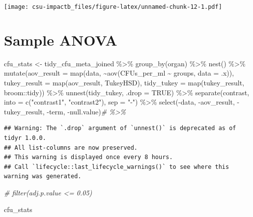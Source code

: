 \documentclass[
]{book}
\newenvironment{Shaded}{\begin{snugshade}}{\end{snugshade}}
\newcommand{\AttributeTok}[1]{\textcolor[rgb]{0.77,0.63,0.00}{#1}}
\newcommand{\CommentTok}[1]{\textcolor[rgb]{0.56,0.35,0.01}{\textit{#1}}}
\newcommand{\ConstantTok}[1]{\textcolor[rgb]{0.00,0.00,0.00}{#1}}
\newcommand{\FunctionTok}[1]{\textcolor[rgb]{0.00,0.00,0.00}{#1}}
\newcommand{\NormalTok}[1]{#1}
\newcommand{\OtherTok}[1]{\textcolor[rgb]{0.56,0.35,0.01}{#1}}
\newcommand{\SpecialCharTok}[1]{\textcolor[rgb]{0.00,0.00,0.00}{#1}}
\newcommand{\StringTok}[1]{\textcolor[rgb]{0.31,0.60,0.02}{#1}}
\begin{document}
\texttt{[image: csu-impactb\_files/figure-latex/unnamed-chunk-12-1.pdf]}

\hypertarget{sample-anova}{%
\section{Sample ANOVA}\label{sample-anova}}

\begin{Shaded}
\begin{Highlighting}[]
\NormalTok{cfu\_stats }\OtherTok{\textless{}{-}}\NormalTok{ tidy\_cfu\_meta\_joined }\SpecialCharTok{\%\textgreater{}\%} 
  \FunctionTok{group\_by}\NormalTok{(organ) }\SpecialCharTok{\%\textgreater{}\%}
  \FunctionTok{nest}\NormalTok{() }\SpecialCharTok{\%\textgreater{}\%}
  \FunctionTok{mutate}\NormalTok{(}\AttributeTok{aov\_result =} \FunctionTok{map}\NormalTok{(data, }\SpecialCharTok{\textasciitilde{}}\FunctionTok{aov}\NormalTok{(CFUs\_per\_ml }\SpecialCharTok{\textasciitilde{}}\NormalTok{ groups, }\AttributeTok{data =}\NormalTok{ .x)),}
         \AttributeTok{tukey\_result =} \FunctionTok{map}\NormalTok{(aov\_result, TukeyHSD),}
         \AttributeTok{tidy\_tukey =} \FunctionTok{map}\NormalTok{(tukey\_result, broom}\SpecialCharTok{::}\NormalTok{tidy)) }\SpecialCharTok{\%\textgreater{}\%}
  \FunctionTok{unnest}\NormalTok{(tidy\_tukey, }\AttributeTok{.drop =} \ConstantTok{TRUE}\NormalTok{) }\SpecialCharTok{\%\textgreater{}\%}
  \FunctionTok{separate}\NormalTok{(contrast, }\AttributeTok{into =} \FunctionTok{c}\NormalTok{(}\StringTok{"contrast1"}\NormalTok{, }\StringTok{"contrast2"}\NormalTok{), }\AttributeTok{sep =} \StringTok{"{-}"}\NormalTok{) }\SpecialCharTok{\%\textgreater{}\%}
  \FunctionTok{select}\NormalTok{(}\SpecialCharTok{{-}}\NormalTok{data, }\SpecialCharTok{{-}}\NormalTok{aov\_result, }\SpecialCharTok{{-}}\NormalTok{tukey\_result, }\SpecialCharTok{{-}}\NormalTok{term, }\SpecialCharTok{{-}}\NormalTok{null.value)}\CommentTok{\# \%\textgreater{}\%}
\end{Highlighting}
\end{Shaded}

\begin{verbatim}
## Warning: The `.drop` argument of `unnest()` is deprecated as of tidyr 1.0.0.
## All list-columns are now preserved.
## This warning is displayed once every 8 hours.
## Call `lifecycle::last_lifecycle_warnings()` to see where this warning was generated.
\end{verbatim}

\begin{Shaded}
\begin{Highlighting}[]
  \CommentTok{\# filter(adj.p.value \textless{}= 0.05)}

\NormalTok{cfu\_stats}
\end{Highlighting}
\end{Shaded}
\end{document}
